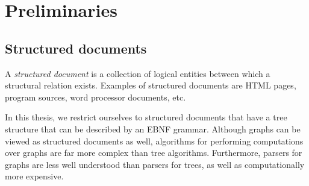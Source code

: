 








\section{Preliminaries}

\subsection{Structured documents} \label{sect:structdocs}



A {\em structured document} is a collection of logical entities between which a structural relation exists. Examples of structured documents are HTML pages, program sources, word processor documents, etc. 

In this thesis, we restrict ourselves to structured documents that have a tree structure that can be described by an EBNF grammar. Although graphs can be viewed as structured documents as well, algorithms for performing computations over graphs are far more complex than tree algorithms. Furthermore, parsers for graphs are less well understood than parsers for trees, as well as computationally more expensive. 

